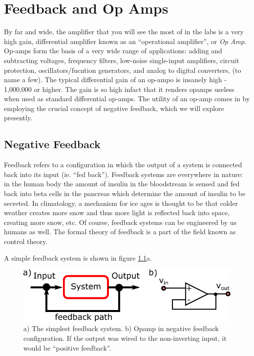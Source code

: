 \documentclass{tufte-book}
\begin{document}
\chapter{Feedback and Op Amps}
By far and wide, the amplifier that you will see the most of in the labs is a very high gain, differential amplifier known as an ``operational amplifier'', or \textit{Op Amp}. Op-amps form the basis of a very wide range of applications: adding and subtracting voltages, frequency filters, low-noise single-input amplifiers, circuit protection, oscillators/fucntion generators, and analog to digital converters, (to name a few). The typical differential gain of an op-ampo is insanely high - 1,000,000 or higher. The gain is so high infact that it renders opamps useless when used as standard differential op-amps. The utility of an op-amp comes in by employing the crucial concept of negative feedback, which we will explore presently.

\section{Negative Feedback}
Feedback refers to a configuration in which the output of a system is connected back into its input (ie. ``fed back''). Feedback systems are everywhere in nature: in the human body the amount of insulin in the bloodstream is sensed and fed back into beta cells in the pancreas which determine the amount of insulin to be secreted. In climatology, a mechanism for ice ages is thought to be that colder weather creates more snow and thus more light is reflected back into space, creating more snow, etc. Of course, feedback systems can be engineered by us humans as well. The formal theory of feedback is a part of the field known as control theory.

A simple feedback system is shown in figure \ref{fig:simple_feedback}a.

\begin{figure}[ht]
\caption{a) The simplest feedback system. b) Opamp in negative feedback configuration. If the output was wired to the non-inverting input, it would be ``positive feedback''.}
\label{fig:simple_feedback}
\begin{center}
\includegraphics[]{Images/simple_feedback.pdf}
\end{center}
\end{figure}
\end{document}
